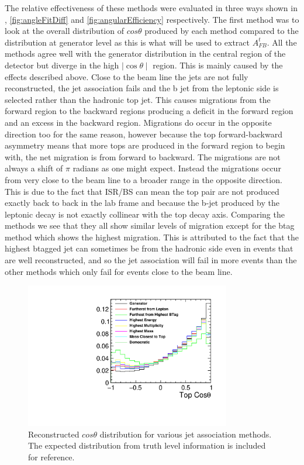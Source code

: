 The relative effectiveness of these methods were evaluated in three ways shown in , \ref{fig:angleFitDiff} and \ref{fig:angularEfficiency} respectively. The first method was to look at the overall distribution of $cos\theta$ produced by each method compared to the distribution at generator level as this is what will be used to extract $A_{FB}^{t}$. All the methods agree well with the generator distribution in the central region of the detector but diverge in the high $\mid\cos\theta\mid$ region. This is mainly caused by the effects described above. Close to the beam line the jets are not fully reconstructed, the jet association fails and the b jet from the leptonic side is selected rather than the hadronic top jet. This causes migrations from the forward region to the backward regions producing a deficit in the forward region and an excess in the backward region. Migrations do occur in the opposite direction too for the same reason, however because the top forward-backward asymmetry means that more tops are produced in the forward region to begin with, the net migration is from forward to backward. The migrations are not always a shift of $\pi$ radians as one might expect. Instead the migrations occur from very close to the beam line to a broader range in the opposite direction. This is due to the fact that \ac{ISR}/\ac{BS} can mean the top pair are not produced exactly back to back in the lab frame and because the b-jet produced by the leptonic decay is not exactly collinear with the top decay axis. Comparing the methods we see that they all show similar levels of migration except for the btag method which shows the highest migration. This is attributed to the fact that the highest btagged jet can sometimes be from the hadronic side even in events that are well reconstructed, and so the jet association will fail in more events than the other methods which only fail for events close to the beam line.

\begin{figure}
  \centering
  \includegraphics[width=0.8\textwidth]{TopAnalysis/figures/comparejetmethods.pdf}
  \caption[Reconstructed $cos\theta$ distribution for various jet association methods]{Reconstructed $cos\theta$ distribution for various jet association methods. The expected distribution from truth level information is included for reference.}
  \label{fig:methodComparison}
\end{figure}


